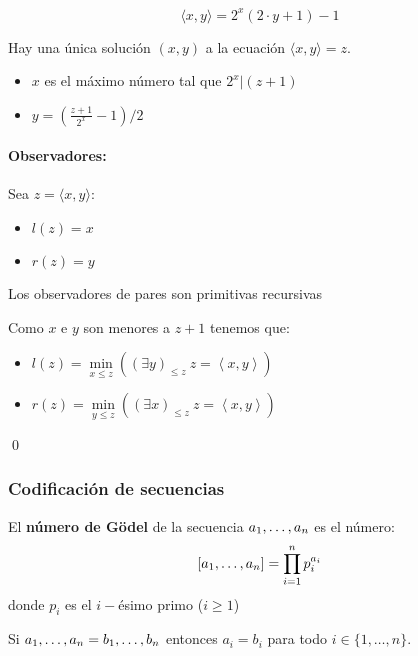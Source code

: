$$\langle x,y \rangle = 2^x(2\cdot y + 1) - 1$$

\begin{proposicion}
Hay una única solución $(x,y)$ a la ecuación $\langle x,y \rangle = z$.
\begin{itemize}
	\item $x$ es el máximo número tal que $2^x | (z+1)$
	\item $y = (\frac{z+1}{2^x} - 1)/2$
\end{itemize}

\end{proposicion} 
\paragraph{Observadores:} Sea $z = \langle x,y \rangle$:
\begin{itemize}
	\item $l(z) = x$
	\item $r(z) = y$
\end{itemize}

\begin{proposicion}\label{proposicion::ObservadoresParesSonPR}
Los observadores de pares son primitivas recursivas
\end{proposicion}
\begin{demo}
	Como $x$ e $y$ son menores a $z +1$ tenemos que:
	\begin{itemize}
		\item $l(z) = \min\limits_{x\leq z} \left(\left(\exists y\right)_{\leq z}~ z = \left\langle x,y\right\rangle\right)$
		\item $r(z) = \min\limits_{y\leq z} \left(\left(\exists x\right)_{\leq z}~ z = \left\langle x,y\right\rangle\right)$
	\end{itemize}\qed
\end{demo}

\subsubsection{Codificación de secuencias}\label{secc::codSecuencias}
El \textbf{número de Gödel} de la secuencia $a_1,\dots, a_{n}$ es el número:
$$[a_1,\dots, a_{n}] = \prod_{i=1}^{n} p_i^{a_i}$$
donde $p_i$ es el $i-$ésimo primo ($i\geq 1$)

\begin{teorema}
Si $a_1,\dots, a_{n} = b_1,\dots, b_{n}$ entonces $a_i = b_i$ para todo $i\in\{1,\dots,n\}$.
\end{teorema}

